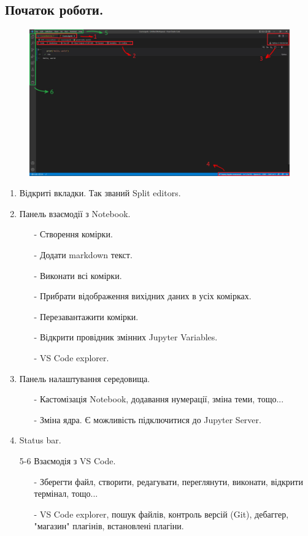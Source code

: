 \documentclass[a4paper,12pt]{article}
\begin{document}
    \subsection {Початок роботи.}
    \hrulefill 
    \begin{figure}[h!]
        \begin{center}
            \includegraphics[scale=0.35]{Prt sc/Figure_6.jpg}
        \end{center}
    \end{figure}
    \begin{enumerate}
        \item Відкриті вкладки. Так званий Split editors.
        \item Панель взаємодії з Notebook.
        \begin{enumerate}
            \item[-] Створення комірки.
            \item[-] Додати markdown текст.
            \item[-] Виконати всі комірки.
            \item[-] Прибрати відображення вихідних даних в усіх комірках.
            \item[-] Перезавантажити комірки. 
            \item[-] Відкрити провідник змінних Jupyter Variables.
            \item[-] VS Code explorer.
        \end{enumerate}
        \item Панель налаштування середовища.
        \begin{enumerate}
            \item[-] Кастомізація Notebook, додавання нумерації, зміна теми, тощо...
            \item[-] Зміна ядра. Є можливість підключитися до Jupyter Server.
        \end{enumerate}
        \item Status bar.
        \item[5-6] Взаємодія з VS Code.
        \begin{enumerate}
            \item[-] Зберегти файл, створити, редагувати, переглянути, виконати, відкрити термінал, тощо...
            \item[-] VS Code explorer, пошук файлів, контроль версій (Git), дебаггер, "магазин" плагінів, встановлені плагіни.
        \end{enumerate}
    \end{enumerate}
\end{document}
